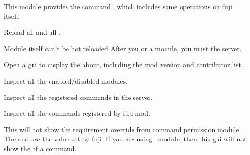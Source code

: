 \label{ch:fuji}

This module provides the command , which includes some operations on fuji itself.

Reload all  and all .

\begin{note}{Module itself can't be hot reloaded}
    After you  or  a module, you must  the server.
\end{note}

Open a gui to display the about, including the mod version and contributor list.

Inspect all the enabled/disabled modules.

Inspect all the registered commands in the server.

Inspect all the commands registered by fuji mod.

\begin{note}{This will not show the requirement override from command permission module}
    The  and  are the  value set by fuji.
    If you are using~ module, then this gui will not show the  of a command.
\end{note}
